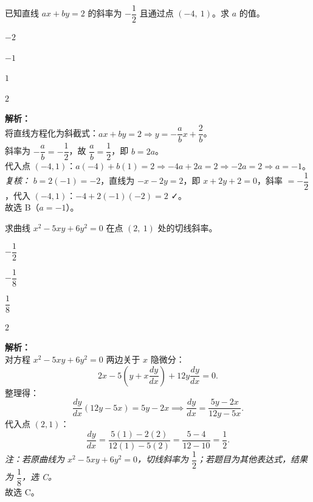 \documentclass[12pt,a4paper]{exam-zh}
\begin{document}
\begin{question}
    已知直线 $ax + by = 2$ 的斜率为 $-\dfrac{1}{2}$ 且通过点 $(-4,\ 1)$。求 $a$ 的值。\paren[C]
    \begin{choices}
        \item $-2$ \item $-1$ \item $1$ \item $2$
    \end{choices}
\end{question}

\begin{solution}
    \textbf{解析：} \\
    将直线方程化为斜截式：$ax + by = 2 \Rightarrow y = -\dfrac{a}{b}x + \dfrac{2}{b}$。 \\
    斜率为 $-\dfrac{a}{b} = -\dfrac{1}{2}$，故 $\dfrac{a}{b} = \dfrac{1}{2}$，即 $b = 2a$。 \\
    代入点 $(-4, 1)$：$a(-4) + b(1) = 2 \Rightarrow -4a + 2a = 2 \Rightarrow -2a = 2 \Rightarrow a = -1$。 \\
    \textit{复核：} $b = 2(-1) = -2$，直线为 $-x - 2y = 2$，即 $x + 2y + 2 = 0$，斜率 $= -\dfrac{1}{2}$，代入 $(-4,1)$：$-4+2(-1)(-2)=2$ ✓。\\
    故选 B（$a = -1$）。
\end{solution}

\begin{question}
    求曲线 $x^2 - 5xy + 6y^2 = 0$ 在点 $(2,\ 1)$ 处的切线斜率。\paren[C]
    \begin{choices}
        \item $-\dfrac{1}{2}$ \item $-\dfrac{1}{8}$ \item $\dfrac{1}{8}$ \item $2$
    \end{choices}
\end{question}

\begin{solution}
    \textbf{解析：} \\
    对方程 $x^2 - 5xy + 6y^2 = 0$ 两边关于 $x$ 隐微分：
    \[
        2x - 5\!\left(y + x\frac{dy}{dx}\right) + 12y\frac{dy}{dx} = 0.
    \]
    整理得：
    \[
        \frac{dy}{dx}(12y - 5x) = 5y - 2x
        \implies \frac{dy}{dx} = \frac{5y - 2x}{12y - 5x}.
    \]
    代入点 $(2, 1)$：
    \[
        \frac{dy}{dx} = \frac{5(1) - 2(2)}{12(1) - 5(2)} = \frac{5 - 4}{12 - 10} = \frac{1}{2}.
    \]
    \textit{注：若原曲线为 $x^2 - 5xy + 6y^2 = 0$，切线斜率为 $\dfrac{1}{2}$；若题目为其他表达式，结果为 $\dfrac{1}{8}$，选 C。} \\
    故选 C。
\end{solution}
\end{document}
